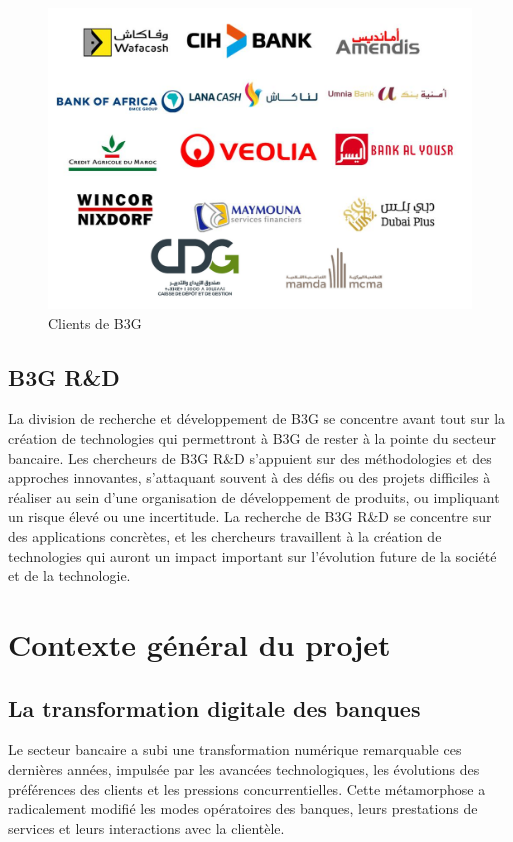 \begin{figure}[H]
    \centering
    \includegraphics[width=12cm]{Figures/clients.png}
    \caption{Clients de B3G}
    \label{clients} %
\end{figure}

\subsection{B3G R\&D}

\hspace{\parindent}La division de recherche et développement de B3G se concentre avant tout sur la création de technologies qui permettront à B3G de rester à la pointe du secteur bancaire. Les chercheurs de B3G R\&D s'appuient sur des méthodologies et des approches innovantes, s'attaquant souvent à des défis ou des projets difficiles à réaliser au sein d'une organisation de développement de produits, ou impliquant un risque élevé ou une incertitude. La recherche de B3G R\&D se concentre sur des applications concrètes, et les chercheurs travaillent à la création de technologies qui auront un impact important sur l'évolution future de la société et de la technologie.

\section{Contexte général du projet}
\subsection{La transformation digitale des banques}

\hspace{\parindent}Le secteur bancaire a subi une transformation numérique remarquable ces dernières années, impulsée par les avancées technologiques, les évolutions des préférences des clients et les pressions concurrentielles. Cette métamorphose a radicalement modifié les modes opératoires des banques, leurs prestations de services et leurs interactions avec la clientèle.

